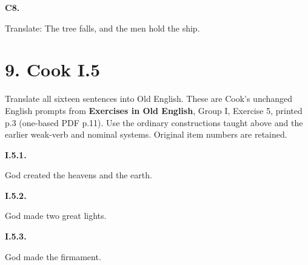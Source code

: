 \par\begin{minipage}{\linewidth}\raggedright
\textbf{C8.}

Translate: The tree falls, and the men hold the ship.

\end{minipage}\par\addvspace{4pt}

\section*{9. Cook I.5}

Translate all sixteen sentences into Old English. These are Cook’s unchanged English prompts from \textbf{Exercises in Old English}, Group I, Exercise 5, printed p.3 (one-based PDF p.11). Use the ordinary constructions taught above and the earlier weak-verb and nominal systems. Original item numbers are retained.

\par\begin{minipage}{\linewidth}\raggedright
\textbf{I.5.1.}

God created the heavens and the earth.

\end{minipage}\par\addvspace{4pt}

\par\begin{minipage}{\linewidth}\raggedright
\textbf{I.5.2.}

God made two great lights.

\end{minipage}\par\addvspace{4pt}

\par\begin{minipage}{\linewidth}\raggedright
\textbf{I.5.3.}

God made the firmament.

\end{minipage}\par\addvspace{4pt}

